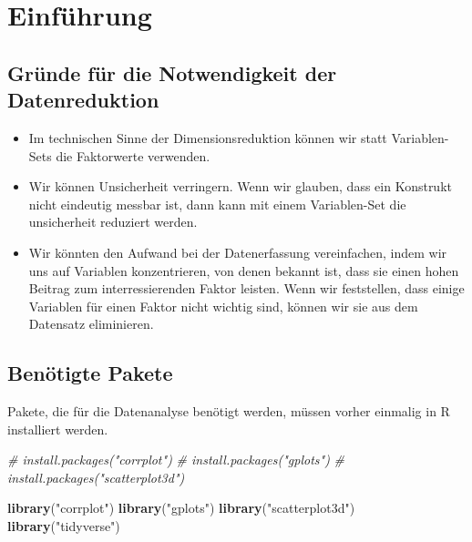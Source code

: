 \documentclass[12pt,]{book}
\newenvironment{Shaded}{\begin{snugshade}}{\end{snugshade}}
\newcommand{\KeywordTok}[1]{\textcolor[rgb]{0.13,0.29,0.53}{\textbf{{#1}}}}
\newcommand{\StringTok}[1]{\textcolor[rgb]{0.31,0.60,0.02}{{#1}}}
\newcommand{\CommentTok}[1]{\textcolor[rgb]{0.56,0.35,0.01}{\textit{{#1}}}}
\newcommand{\NormalTok}[1]{{#1}}
\providecommand{\tightlist}{%
  \setlength{\itemsep}{0pt}\setlength{\parskip}{0pt}}
\begin{document}
\section{Einführung}\label{einfuhrung-1}

\subsection{Gründe für die Notwendigkeit der
Datenreduktion}\label{grunde-fur-die-notwendigkeit-der-datenreduktion}

\begin{itemize}
\tightlist
\item
  Im technischen Sinne der Dimensionsreduktion können wir statt
  Variablen-Sets die Faktorwerte verwenden.
\item
  Wir können Unsicherheit verringern. Wenn wir glauben, dass ein
  Konstrukt nicht eindeutig messbar ist, dann kann mit einem
  Variablen-Set die unsicherheit reduziert werden.
\item
  Wir könnten den Aufwand bei der Datenerfassung vereinfachen, indem wir
  uns auf Variablen konzentrieren, von denen bekannt ist, dass sie einen
  hohen Beitrag zum interressierenden Faktor leisten. Wenn wir
  feststellen, dass einige Variablen für einen Faktor nicht wichtig
  sind, können wir sie aus dem Datensatz eliminieren.
\end{itemize}

\subsection{Benötigte Pakete}\label{benotigte-pakete}

Pakete, die für die Datenanalyse benötigt werden, müssen vorher einmalig
in R installiert werden.

\begin{Shaded}
\begin{Highlighting}[]
\CommentTok{# install.packages("corrplot")}
\CommentTok{# install.packages("gplots")}
\CommentTok{# install.packages("scatterplot3d")}
\end{Highlighting}
\end{Shaded}

\begin{Shaded}
\begin{Highlighting}[]
\KeywordTok{library}\NormalTok{(}\StringTok{"corrplot"}\NormalTok{)}
\KeywordTok{library}\NormalTok{(}\StringTok{"gplots"}\NormalTok{)}
\KeywordTok{library}\NormalTok{(}\StringTok{"scatterplot3d"}\NormalTok{)}
\KeywordTok{library}\NormalTok{(}\StringTok{"tidyverse"}\NormalTok{)}
\end{Highlighting}
\end{Shaded}
\end{document}
